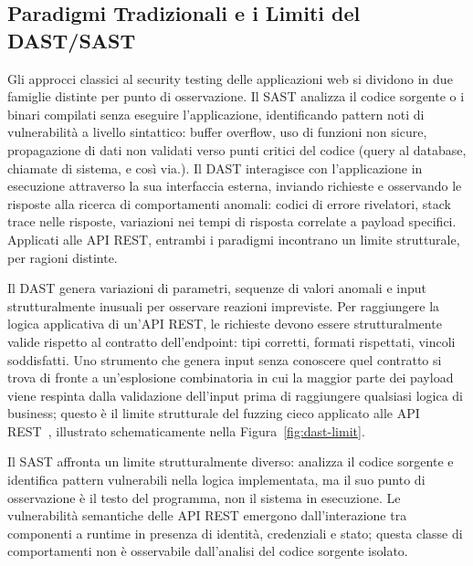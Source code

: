 \subsection{Paradigmi Tradizionali e i Limiti del DAST/SAST}\label{subsec:dast-sast}

Gli approcci classici al security testing delle applicazioni web si dividono in due famiglie distinte per punto di osservazione. Il \gls{SAST} analizza il codice sorgente o i binari compilati senza eseguire l'applicazione, identificando pattern noti di vulnerabilità a livello sintattico: buffer overflow, uso di funzioni non sicure, propagazione di dati non validati verso punti critici del codice (query al database, chiamate di sistema, e così via.).
Il \gls{DAST} interagisce con l'applicazione in esecuzione attraverso la sua interfaccia esterna, inviando richieste e osservando le risposte alla ricerca di comportamenti anomali: codici di errore rivelatori, stack trace nelle risposte, variazioni nei tempi di risposta correlate a payload specifici.
Applicati alle \gls{API} REST, entrambi i paradigmi incontrano un limite strutturale, per ragioni distinte.

Il \gls{DAST} genera variazioni di parametri, sequenze di valori anomali e input strutturalmente inusuali per osservare reazioni impreviste. Per raggiungere la logica applicativa di un'\gls{API} REST, le richieste devono essere strutturalmente valide rispetto al contratto dell'endpoint: tipi corretti, formati rispettati, vincoli soddisfatti. Uno strumento che genera input senza conoscere quel contratto si trova di fronte a un'esplosione combinatoria in cui la maggior parte dei payload viene respinta dalla validazione dell'input prima di raggiungere qualsiasi logica di business; questo è il limite strutturale del fuzzing cieco applicato alle \gls{API} \gls{REST}~\cite{atlidakisRESTlerStatefulREST2019a,golmohammadiTestingRESTfulAPIs2023}, illustrato schematicamente nella Figura~\ref{fig:dast-limit}.



Il \gls{SAST} affronta un limite strutturalmente diverso: analizza il codice sorgente e identifica pattern vulnerabili nella logica implementata, ma il suo punto di osservazione è il testo del programma, non il sistema in esecuzione. Le vulnerabilità semantiche delle \gls{API} REST emergono dall'interazione tra componenti a runtime in presenza di identità, credenziali e stato; questa classe di comportamenti non è osservabile dall'analisi del codice sorgente isolato.

